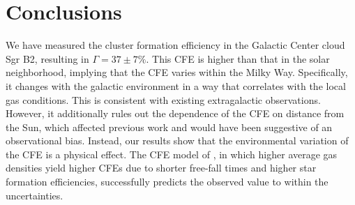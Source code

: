 \documentclass[twocolumn]{aastex62}
\begin{document}
\section{Conclusions}
We have measured the cluster formation efficiency in the Galactic Center cloud
Sgr B2, resulting in $\Gamma=37\pm7\%$. This CFE is higher than that in the solar
neighborhood, implying that the CFE varies within the Milky Way. Specifically,
it changes with the galactic environment in a way that correlates with the
local gas conditions. This is consistent with existing extragalactic
observations. However, it additionally rules out the dependence of the CFE on
distance from the Sun, which affected previous work and would have been
suggestive of an observational bias. Instead, our results show that the
environmental variation of the CFE is a physical effect. The CFE model of
\citet{Kruijssen2012a}, in which higher average gas densities yield higher CFEs
due to shorter free-fall times and higher star formation efficiencies,
successfully predicts the observed value to within the uncertainties.





\end{document}
